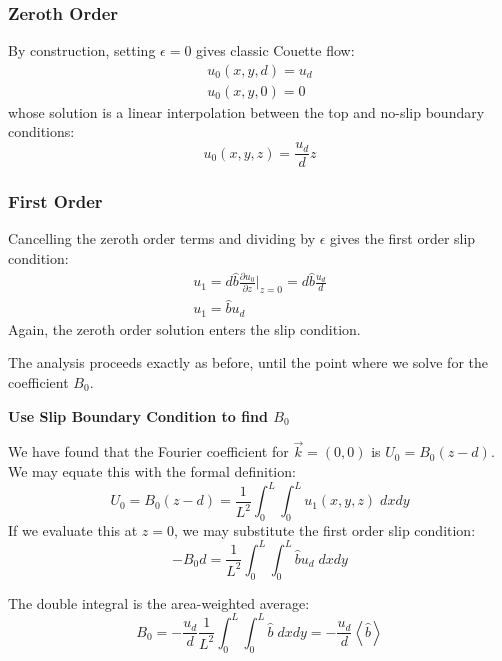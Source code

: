 \documentclass[a4paper]{report}
\begin{document}
\subsubsection*{Zeroth Order}

By construction, setting $\epsilon = 0$ gives classic Couette flow:
\begin{gather}
u_0(x,y,d) = u_d \\
u_0(x,y,0) = 0
\end{gather}
whose solution is a linear interpolation between the top and no-slip boundary conditions:
\begin{equation}
u_0(x,y,z) = \frac{u_d}{d} z
\end{equation}

\subsubsection*{First Order}
Cancelling the zeroth order terms and dividing by $\epsilon$ gives the first order slip condition:
\begin{gather}
u_1 = d \hat{b} \frac{\partial u_0}{\partial z} \rvert_{z=0}
= d \hat{b} \frac{u_d}{d} \\
u_1 = \hat{b} u_d
\end{gather}
Again, the zeroth order solution enters the slip condition.

\vspace{1em}
The analysis proceeds exactly as before, until the point where we solve for the coefficient $B_0$.
\vspace{1em}

\textbf{Use Slip Boundary Condition to find $B_0$}

We have found that the Fourier coefficient for $\vec{k} = (0,0)$ is $U_0 = B_0 (z - d)$.
We may equate this with the formal definition:
\begin{equation}
U_0 = B_0 (z - d) = \frac{1}{L^2} \int_0^L \int_0^L u_1(x,y,z) \;dxdy
\end{equation}
If we evaluate this at $z=0$, we may substitute the first order slip condition:
\begin{equation}
- B_0 d = \frac{1}{L^2} \int_0^L \int_0^L \hat{b} u_d \;dxdy
\end{equation}

The double integral is the area-weighted average:
\begin{equation}
B_0 = - \frac{u_d}{d} \frac{1}{L^2} \int_0^L \int_0^L \hat{b} \;dxdy
= - \frac{u_d}{d} \left< \hat{b} \right>
\end{equation}
\end{document}
